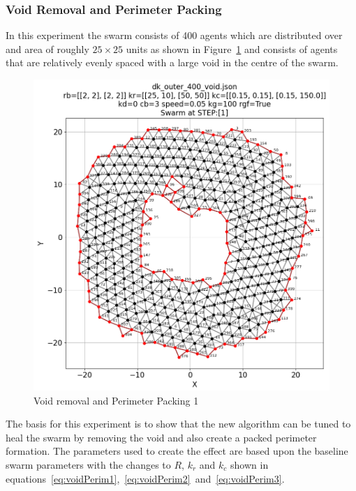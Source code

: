 \documentclass[12pt,a4paper]{IEEEtran}
\newcommand{\kc}{\mathit{k_{c}}}
\newcommand{\kr}{\mathit{k_{r}}}
\newcommand{\rb}{\mathit{R}}
\begin{document}
\subsubsection{Void Removal and Perimeter Packing}

In this experiment the swarm consists of 400 agents which are distributed over and area of roughly $25\times 25$ units as shown in Figure~\ref{fig:voidPerim1} and consists of agents that are relatively evenly spaced with a large void in the centre of the swarm. 

\begin{figure}[H]
	\begin{center}
		\includegraphics[width=1.0\linewidth]{figures/voidPerim1}
	\end{center}
	\caption{Void removal and Perimeter Packing 1\label{fig:voidPerim1}}
\end{figure}

The basis for this experiment is to show that the new algorithm can be tuned to heal the swarm by removing the void and also create a packed perimeter formation. The parameters used to create the effect are based upon the baseline swarm parameters with the changes to $\rb$, $\kr$ and $\kc$ shown in equations~\ref{eq:voidPerim1},~\ref{eq:voidPerim2}~and~\ref{eq:voidPerim3}.
\end{document}
